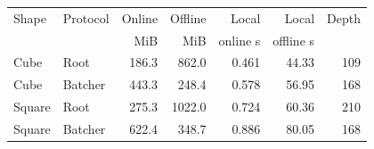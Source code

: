 \begin{tabular}{llrrrrr}
\hline
Shape & Protocol & Online & Offline & Local & Local & Depth \\
 & & MiB & MiB & online s & offline s & \\
\hline
Cube & Root & 186.3 & 862.0 & 0.461 & 44.33 & 109 \\
Cube & Batcher & 443.3 & 248.4 & 0.578 & 56.95 & 168 \\
\hline
Square & Root & 275.3 & 1022.0 & 0.724 & 60.36 & 210 \\
Square & Batcher & 622.4 & 348.7 & 0.886 & 80.05 & 168 \\
\hline
\end{tabular}
